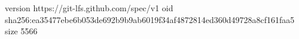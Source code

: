 version https://git-lfs.github.com/spec/v1
oid sha256:ea35477ebe6b053de692b9b9ab6019f34af4872814ed360d49728a8cf161faa5
size 5566
